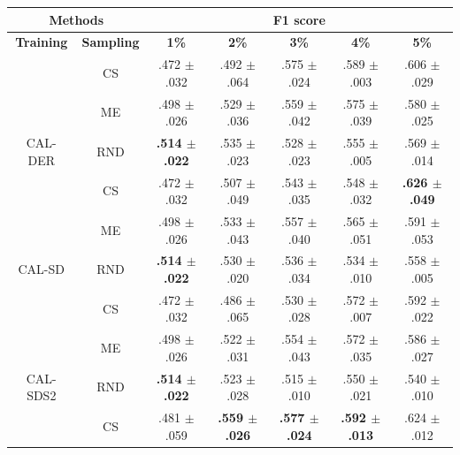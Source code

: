 \begin{table}[htbp]
\centering

\begin{tabular*}{\linewidth}{c|c|@{\extracolsep{\fill}}ccccc}
\toprule
\multicolumn{2}{c|}{\textbf{Methods}} & \multicolumn{5}{c}{\textbf{F1 score}} \\
\midrule
\textbf{Training} & \textbf{Sampling} & \textbf{1\%} & \textbf{2\%} & \textbf{3\%} & \textbf{4\%} & \textbf{5\%}\\
\midrule
 & CS & .472 $\pm$ {\small .032} & .492 $\pm$ {\small .064} & .575 $\pm$ {\small .024} & .589 $\pm$ {\small .003} & .606 $\pm$ {\small .029}\\

 & ME & .498 $\pm$ {\small .026} & .529 $\pm$ {\small .036} & .559 $\pm$ {\small .042} & .575 $\pm$ {\small .039} & .580 $\pm$ {\small .025}\\

\multirow{-3}{*}{\raggedright\arraybackslash CAL-DER} & RND & \textbf{.514 $\pm$ {\small .022}} & .535 $\pm$ {\small .023} & .528 $\pm$ {\small .023} & .555 $\pm$ {\small .005} & .569 $\pm$ {\small .014}\\
\midrule
 & CS & .472 $\pm$ {\small .032} & .507 $\pm$ {\small .049} & .543 $\pm$ {\small .035} & .548 $\pm$ {\small .032} & \textbf{.626 $\pm$ {\small .049}}\\

 & ME & .498 $\pm$ {\small .026} & .533 $\pm$ {\small .043} & .557 $\pm$ {\small .040} & .565 $\pm$ {\small .051} & .591 $\pm$ {\small .053}\\

\multirow{-3}{*}{\raggedright\arraybackslash CAL-SD} & RND & \textbf{.514 $\pm$ {\small .022}} & .530 $\pm$ {\small .020} & .536 $\pm$ {\small .034} & .534 $\pm$ {\small .010} & .558 $\pm$ {\small .005}\\
\midrule
 & CS & .472 $\pm$ {\small .032} & .486 $\pm$ {\small .065} & .530 $\pm$ {\small .028} & .572 $\pm$ {\small .007} & .592 $\pm$ {\small .022}\\

 & ME & .498 $\pm$ {\small .026} & .522 $\pm$ {\small .031} & .554 $\pm$ {\small .043} & .572 $\pm$ {\small .035} & .586 $\pm$ {\small .027}\\

\multirow{-3}{*}{\raggedright\arraybackslash CAL-SDS2} & RND & \textbf{.514 $\pm$ {\small .022}} & .523 $\pm$ {\small .028} & .515 $\pm$ {\small .010} & .550 $\pm$ {\small .021} & .540 $\pm$ {\small .010}\\
\midrule
 & CS & .481 $\pm$ {\small .059} & \textbf{.559 $\pm$ {\small .026}} & \textbf{.577 $\pm$ {\small .024}} & \textbf{.592 $\pm$ {\small .013}} & .624 $\pm$ {\small .012}\\


\end{tabular*}
\end{table}
